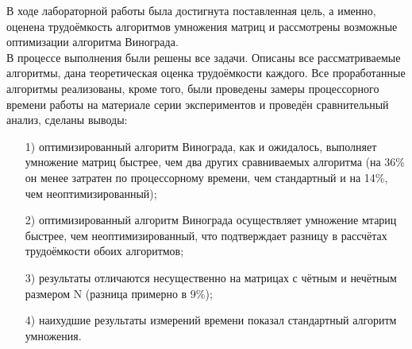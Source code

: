 В ходе лабораторной работы была достигнута поставленная цель, а именно, оценена трудоёмкость алгоритмов умножения матриц и рассмотрены возможные оптимизации алгоритма Винограда.  \\

В процессе выполнения были решены все задачи. Описаны все рассматриваемые алгоритмы, дана теоретическая оценка трудоёмкости каждого. Все проработанные алгоритмы реализованы, кроме того, были проведены замеры процессорного времени работы на материале серии экспериментов и проведён сравнительный анализ, сделаны выводы:
\begin{itemize}
	\item[1)]оптимизированный алгоритм Винограда, как и ожидалось, выполняет умножение матриц быстрее, чем два других сравниваемых алгоритма (на 36\% он менее затратен по процессорному времени, чем стандартный и на 14\%, чем неоптимизированный);
	\item[2)]оптимизированный алгоритм Винограда осуществляет умножение мтариц быстрее, чем неоптимизированный, что подтверждает разницу в рассчётах трудоёмкости обоих алгоритмов;
	\item[3)]результаты отличаются несущественно на матрицах с чётным и нечётным размером N (разница примерно в 9\%);
	\item[4)]наихудшие результаты измерений времени показал стандартный алгоритм умножения.
\end{itemize}